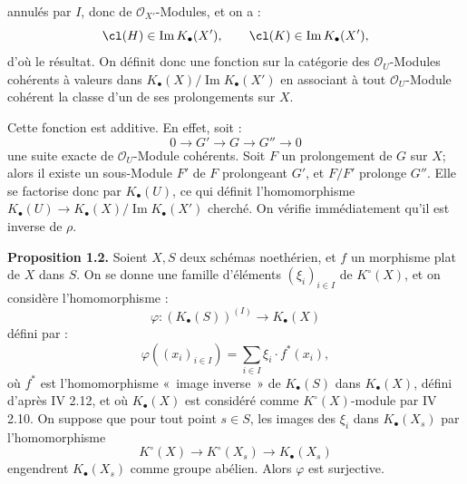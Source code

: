 annulés par $I$, donc de $\mathcal O_{X'}$-Modules, et on a :
\[
\cl(H)\in \operatorname{Im}K_\bullet(X'),\qquad
\cl(K)\in \operatorname{Im}K_\bullet(X'),
\]
d'où le résultat. On définit donc une fonction sur la catégorie des $\mathcal O_U$-Modules cohérents à valeurs dans $K_\bullet(X)/\operatorname{Im}K_\bullet(X')$ en associant à tout $\mathcal O_U$-Module cohérent la classe d'un de ses prolongements sur $X$.

Cette fonction est additive. En effet, soit :
\[
0\longrightarrow G'\longrightarrow G\longrightarrow G''\longrightarrow 0
\]
une suite exacte de $\mathcal O_U$-Module cohérents. Soit $F$ un prolongement de $G$ sur $X$; alors il existe un sous-Module $F'$ de $F$ prolongeant $G'$, et $F/F'$ prolonge $G''$. Elle se factorise donc par $K_\bullet(U)$, ce qui définit l'homomorphisme $K_\bullet(U)\to K_\bullet(X)/\operatorname{Im}K_\bullet(X')$ cherché. On vérifie immédiatement qu'il est inverse de $\rho$.

\textbf{Proposition 1.2.} Soient $X,S$ deux schémas noethérien, et $f$ un morphisme plat de $X$ dans $S$. On se donne une famille d'éléments $(\xi_i)_{i\in I}$ de $K^\circ(X)$, et on considère l'homomorphisme :
\[
\varphi:(K_\bullet(S))^{(I)}\longrightarrow K_\bullet(X)
\]
défini par :
\[
\varphi((x_i)_{i\in I})=\sum_{i\in I}\xi_i\cdot f^*(x_i),
\]
où $f^*$ est l'homomorphisme «~image inverse~» de $K_\bullet(S)$ dans $K_\bullet(X)$, défini d'après IV 2.12, et où $K_\bullet(X)$ est considéré comme $K^\circ(X)$-module par IV 2.10. On suppose que pour tout point $s\in S$, les images des $\xi_i$ dans $K_\bullet(X_s)$ par l'homomorphisme
\[
K^\circ(X)\longrightarrow K^\circ(X_s)\longrightarrow K_\bullet(X_s)
\]
engendrent $K_\bullet(X_s)$ comme groupe abélien. Alors $\varphi$ est surjective.

